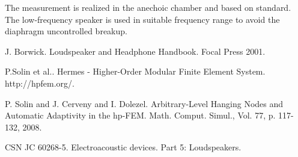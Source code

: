 The measurement is realized in the anechoic chamber and based on standard. \cite{4kk} The low-frequency speaker is used in suitable frequency range to avoid the diaphragm uncontrolled breakup. 


\begin{thebibliography}{10}

{\sc J. Borwick}. {Loudspeaker and Headphone Handbook}. Focal Press 2001.



{\sc P.Solin et al.}. {Hermes - Higher-Order Modular Finite Element System}. http://hpfem.org/.



{\sc P. Solin and J. Cerveny and I. Dolezel}. {Arbitrary-Level Hanging Nodes and Automatic Adaptivity in the hp-FEM}. Math. Comput. Simul., Vol. 77, p. 117-132, 2008.



{\sc CSN JC 60268-5}. {Electroacoustic devices}. Part 5: Loudspeakers.

\end{thebibliography}
